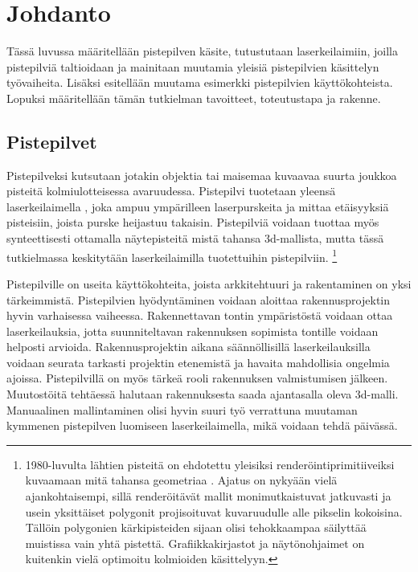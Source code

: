 \section{Johdanto}
Tässä luvussa määritellään pistepilven käsite, tutustutaan laserkeilaimiin, joilla pistepilviä taltioidaan ja mainitaan muutamia yleisiä pistepilvien käsittelyn työvaiheita. Lisäksi esitellään muutama esimerkki pistepilvien käyttökohteista. Lopuksi määritellään tämän tutkielman tavoitteet, toteutustapa ja rakenne.

\subsection{Pistepilvet}

Pistepilveksi kutsutaan jotakin objektia tai maisemaa kuvaavaa suurta joukkoa pisteitä kolmiulotteisessa avaruudessa. Pistepilvi tuotetaan yleensä laserkeilaimella , joka ampuu ympärilleen laserpurskeita ja mittaa etäisyyksiä pisteisiin, joista purske heijastuu takaisin. Pistepilviä voidaan tuottaa myös synteettisesti ottamalla näytepisteitä mistä tahansa 3d-mallista, mutta tässä tutkielmassa keskitytään laserkeilaimilla tuotettuihin pistepilviin. \footnote{1980-luvulta lähtien pisteitä on ehdotettu yleisiksi renderöintiprimitiiveiksi kuvaamaan mitä tahansa geometriaa \cite{Whitted}. Ajatus on nykyään vielä ajankohtaisempi, sillä renderöitävät mallit monimutkaistuvat jatkuvasti ja usein yksittäiset polygonit projisoituvat kuvaruudulle alle pikselin kokoisina. Tällöin polygonien kärkipisteiden sijaan olisi tehokkaampaa säilyttää muistissa vain yhtä pistettä. Grafiikkakirjastot ja näytönohjaimet on kuitenkin vielä optimoitu kolmioiden käsittelyyn.}

Pistepilville on useita käyttökohteita, joista arkkitehtuuri ja rakentaminen on yksi tärkeimmistä. Pistepilvien hyödyntäminen voidaan aloittaa rakennusprojektin hyvin varhaisessa vaiheessa. Rakennettavan tontin ympäristöstä voidaan ottaa laserkeilauksia, jotta suunniteltavan rakennuksen sopimista tontille voidaan helposti arvioida. Rakennusprojektin aikana säännöllisillä laserkeilauksilla voidaan seurata tarkasti projektin etenemistä ja havaita mahdollisia ongelmia ajoissa. Pistepilvillä on myös tärkeä rooli rakennuksen valmistumisen jälkeen. Muutostöitä tehtäessä halutaan rakennuksesta saada ajantasalla oleva 3d-malli. Manuaalinen mallintaminen olisi hyvin suuri työ verrattuna muutaman kymmenen pistepilven luomiseen laserkeilaimella, mikä voidaan tehdä päivässä. \cite{bim} 

